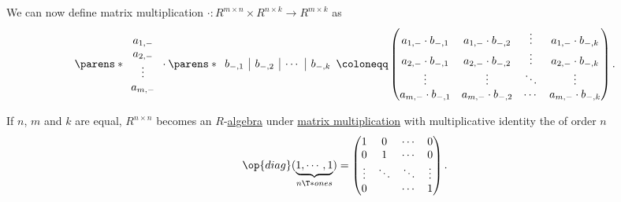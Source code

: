 \begin{proposition}
\begin{thmenum}
    We can now define matrix multiplication \( \cdot: R^{m \times n} \times R^{n \times k} \to R^{m \times k} \) as
    \begin{equation*}
     \parens*
       {
         \begin{array}{c}
            a_{1,-} \\
            a_{2,-} \\
            \vdots \\
            a_{m,-}
          \end{array}
        }
      \cdot
      \parens*
        {
          \begin{array}{c|c|c|c}
            b_{-,1} & b_{-,2} & \cdots & b_{-,k}
          \end{array}
        }
      \coloneqq
      \begin{pmatrix}
        a_{1,-} \cdot b_{-,1} & a_{1,-} \cdot b_{-,2} & \vdots & a_{1,-} \cdot b_{-,k} \\
        a_{2,-} \cdot b_{-,1} & a_{2,-} \cdot b_{-,2} & \vdots & a_{2,-} \cdot b_{-,k} \\
        \vdots                & \vdots                & \ddots & \vdots                \\
        a_{m,-} \cdot b_{-,1} & a_{m,-} \cdot b_{-,2} & \cdots & a_{m,-} \cdot b_{-,k}
      \end{pmatrix}.
    \end{equation*}

    If \( n \), \( m \) and \( k \) are equal, \( R^{n \times n} \) becomes an \( R \)-\hyperref[def:algebra_over_semiring]{algebra} under \hyperref[thm:matrix_algebra/matrix_multiplication]{matrix multiplication} with multiplicative identity the  of order \( n \)
    \begin{equation}\label{eq:thm:matrix_algebra/matrix_multiplication/identity}
      \op{diag}(\underbrace{ 1, \cdots, 1 }_{n \T*{ones}})
      =
      \begin{pmatrix}
        1       & 0      & \cdots & 0      \\
        0       & 1      & \cdots & 0      \\
        \vdots  & \ddots & \ddots & \vdots \\
        0       &        & \cdots & 1
      \end{pmatrix}.
    \end{equation}
  \end{thmenum}
\end{proposition}
